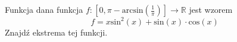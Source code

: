 \documentclass[11pt]{scrartcl}
\begin{document}
         \begin{zadanie}
           Funkcja dana funkcja $f: [0, \pi - \text{arcsin} \left ( \frac{1}{\pi } \right ) ] \to \mathbb{R} $ jest wzorem
             \[
                 f = x \text{sin}^2 \left ( x \right ) + \text{sin} \left ( x \right ) \cdot \text{cos} \left ( x \right ) 
             \]
             Znajdź ekstrema tej funkcji.
         \end{zadanie}
         
      
\end{document}
